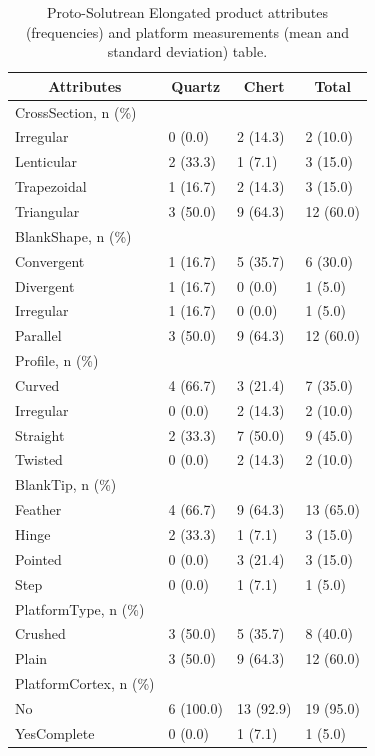 \documentclass[12pt,twoside]{reedthesis}
\begin{document}
\begin{longtable}[t]{llll}
\caption{\label{tab:unnamed-chunk-79}Proto-Solutrean Elongated product attributes (frequencies) and platform measurements (mean and standard deviation) table.}\\
\toprule
\multicolumn{1}{c}{\textbf{Attributes}} & \multicolumn{1}{c}{\textbf{Quartz}} & \multicolumn{1}{c}{\textbf{Chert}} & \multicolumn{1}{c}{\textbf{Total}}\\
\midrule
CrossSection, n (\%) &  &  & \\
Irregular & 0 (0.0) & 2 (14.3) & 2 \vphantom{1} (10.0)\\
Lenticular & 2 (33.3) & 1 (7.1) & 3 (15.0)\\
Trapezoidal & 1 (16.7) & 2 (14.3) & 3 (15.0)\\
Triangular & 3 (50.0) & 9 (64.3) & 12 (60.0)\\
\addlinespace
BlankShape, n (\%) &  &  & \\
Convergent & 1 (16.7) & 5 (35.7) & 6 (30.0)\\
Divergent & 1 (16.7) & 0 (0.0) & 1 (5.0)\\
Irregular & 1 (16.7) & 0 (0.0) & 1 (5.0)\\
Parallel & 3 (50.0) & 9 (64.3) & 12 (60.0)\\
\addlinespace
Profile, n (\%) &  &  & \\
Curved & 4 (66.7) & 3 (21.4) & 7 (35.0)\\
Irregular & 0 (0.0) & 2 (14.3) & 2 (10.0)\\
Straight & 2 (33.3) & 7 (50.0) & 9 (45.0)\\
Twisted & 0 (0.0) & 2 (14.3) & 2 (10.0)\\
\addlinespace
BlankTip, n (\%) &  &  & \\
Feather & 4 (66.7) & 9 (64.3) & 13 (65.0)\\
Hinge & 2 (33.3) & 1 (7.1) & 3 (15.0)\\
Pointed & 0 (0.0) & 3 (21.4) & 3 (15.0)\\
Step & 0 (0.0) & 1 (7.1) & 1 (5.0)\\
\addlinespace
PlatformType, n (\%) &  &  & \\
Crushed & 3 (50.0) & 5 (35.7) & 8 (40.0)\\
Plain & 3 (50.0) & 9 (64.3) & 12 (60.0)\\
PlatformCortex, n (\%) &  &  & \\
No & 6 (100.0) & 13 (92.9) & 19 (95.0)\\
\addlinespace
YesComplete & 0 (0.0) & 1 (7.1) & 1 (5.0)\\

\end{longtable}
\end{document}
